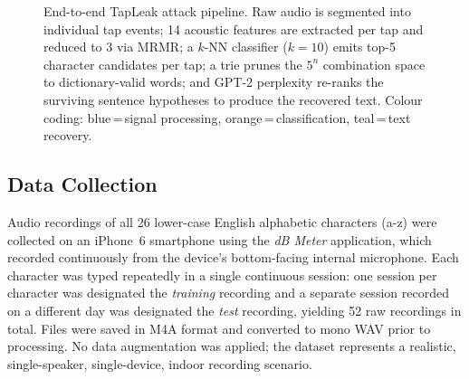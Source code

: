 \documentclass[conference]{IEEEtran}
\begin{document}
\begin{figure}[!ht]
{}
\caption{End-to-end TapLeak attack pipeline. Raw audio is segmented
into individual tap events; 14 acoustic features are extracted per
tap and reduced to 3 via MRMR; a $k$-NN classifier ($k{=}10$) emits
top-5 character candidates per tap; a trie prunes the $5^n$
combination space to dictionary-valid words; and GPT-2 perplexity
re-ranks the surviving sentence hypotheses to produce the recovered
text. Colour coding: blue\,=\,signal processing,
orange\,=\,classification, teal\,=\,text recovery.}
\label{fig:pipeline}
\end{figure}

\subsection{Data Collection}

Audio recordings of all 26 lower-case English alphabetic characters
(a-z) were collected on an iPhone~6 smartphone using the \textit{dB Meter} application, which recorded continuously from the device's bottom-facing internal microphone.
Each character was typed repeatedly in a single continuous session:
one session per character was designated the \emph{training}
recording and a separate session recorded on a different day was
designated the \emph{test} recording, yielding 52 raw recordings in total.
Files were saved in M4A format and converted to mono WAV prior to
processing.
No data augmentation was applied; the dataset represents a
realistic, single-speaker, single-device, indoor recording
scenario.
\end{document}
